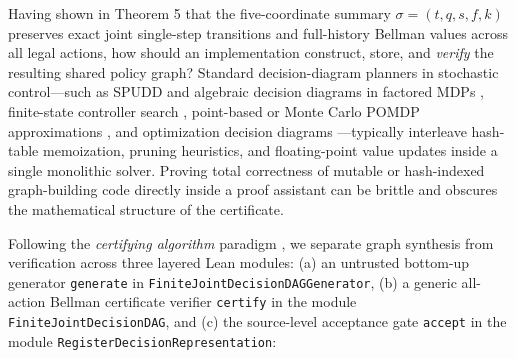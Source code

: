 \documentclass[11pt,letterpaper]{article}
\begin{document}
Having shown in Theorem 5 that the five-coordinate summary
\(\sigma = (t, q, s, f, k)\) preserves exact joint single-step
transitions and full-history Bellman values across all legal actions,
how should an implementation construct, store, and \emph{verify} the
resulting shared policy graph? Standard decision-diagram planners in
stochastic control---such as SPUDD and algebraic decision diagrams in
factored MDPs \citep{bryant1986, bahar1997, hoey1999, boutilier2000},
finite-state controller search
\citep{littman1995, hansen1998, meuleau1999, poupartBoutilier2003},
point-based or Monte Carlo POMDP approximations
\citep{pineau2003, spaanVlassis2005, silverVeness2010}, and optimization
decision diagrams \citep{bergman2016}---typically interleave hash-table
memoization, pruning heuristics, and floating-point value updates inside
a single monolithic solver. Proving total correctness of mutable or
hash-indexed graph-building code directly inside a proof assistant can
be brittle and obscures the mathematical structure of the certificate.

Following the \emph{certifying algorithm} paradigm
\citep{blumKannan1995, mcconnell2011}, we separate graph synthesis from
verification across three layered Lean modules: (a) an untrusted
bottom-up generator \texttt{generate} in
\texttt{FiniteJointDecisionDAGGenerator}, (b) a generic all-action
Bellman certificate verifier \texttt{certify} in the module
\texttt{FiniteJointDecisionDAG}, and (c) the source-level acceptance
gate \texttt{accept} in the module
\texttt{RegisterDecisionRepresentation}:
\end{document}
